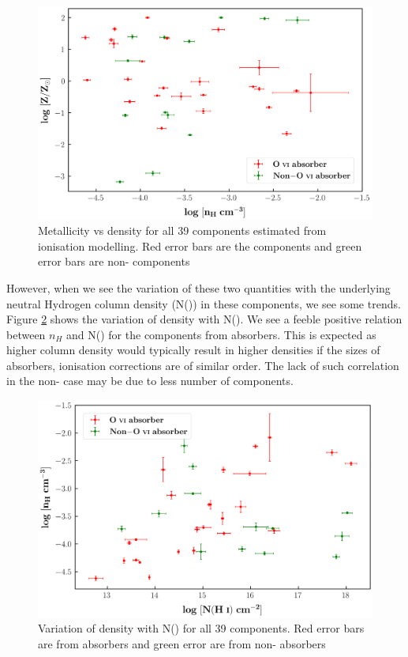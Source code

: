 \begin{figure}[!t]
    \centering
    \includegraphics[width=\linewidth]{Figures/Z_vs_nH.png}
    \caption{Metallicity vs density for all 39 components estimated from ionisation modelling. Red error bars are the  components and green error bars are non- components}
    \label{fig:nH-Z}
\end{figure}

However, when we see the variation of these two quantities with the underlying neutral Hydrogen column density (N()) in these components, we see some trends. Figure \ref{fig:nH-NHi} shows the variation of density with N(). We see a feeble positive relation between $n_H$ and N() for the components from  absorbers. This is expected as higher column density would typically result in higher densities if the sizes of absorbers, ionisation corrections are of similar order. The lack of such correlation in the non- case may be due to less number of components.

\begin{figure}[!htbp]
    \centering
    \includegraphics[width=0.9\linewidth]{Figures/nH_vs_NHi.png}
    \caption{Variation of density with N() for all 39 components. Red error bars are from  absorbers and green error are from non- absorbers}
    \label{fig:nH-NHi}
\end{figure}

